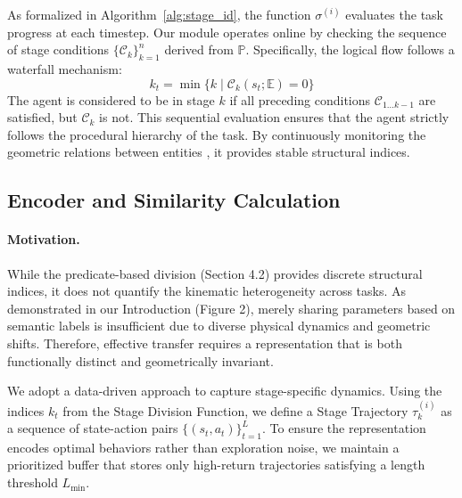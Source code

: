 \documentclass{article}
\begin{document}
As formalized in Algorithm~\ref{alg:stage_id}, the function $\sigma^{(i)}$ evaluates the task progress at each timestep.
Our module operates online by checking the sequence of stage conditions $\{\mathcal{C}_k\}_{k=1}^n$ derived from $\mathbb{P}$.
Specifically, the logical flow follows a waterfall mechanism:
\begin{equation}
k_t = \min\{ k \mid \mathcal{C}_k(s_t; \mathbb{E}) = 0 \}
\end{equation}
The agent is considered to be in stage $k$ if all preceding conditions $\mathcal{C}_{1 \dots k-1}$ are satisfied, but $\mathcal{C}_k$ is not.
This sequential evaluation ensures that the agent strictly follows the procedural hierarchy of the task.
By continuously monitoring the geometric relations between entities , it provides stable structural indices.




\subsection{Encoder and Similarity Calculation}

\paragraph{Motivation.}
While the predicate-based division (Section 4.2) provides discrete structural indices, it does not quantify the kinematic heterogeneity across tasks.
As demonstrated in our Introduction (Figure 2), merely sharing parameters based on semantic labels is insufficient due to diverse physical dynamics and geometric shifts.
Therefore, effective transfer requires a representation that is both functionally distinct and geometrically invariant.

We adopt a data-driven approach to capture stage-specific dynamics.
Using the indices $k_t$ from the Stage Division Function, we define a Stage Trajectory $\tau^{(i)}_{k}$ as a sequence of state-action pairs $\{(s_t, a_t)\}_{t=1}^{L}$.
To ensure the representation encodes optimal behaviors rather than exploration noise, we maintain a prioritized buffer that stores only high-return trajectories satisfying a length threshold $L_{\min}$.
\end{document}

